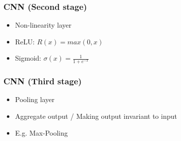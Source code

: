   \begin{frame}
   \frametitle{CNN (Second stage)}
   
   \begin{itemize}
    \item<1-> Non-linearity layer
    \item<2-> ReLU: $R(x) = max(0,x)$
    \item<3-> Sigmoid: $\sigma(x) = \frac{1}{1+e^{-x}}$
   \end{itemize}
   
  \end{frame}
  \begin{frame}
   \frametitle{CNN (Third stage)}
   
   \begin{itemize}
    \item<1-> Pooling layer
    \item<2-> Aggregate output / Making output invariant to input
    \item<3-> E.g. Max-Pooling
   \end{itemize}
  
  \end{frame}
 
